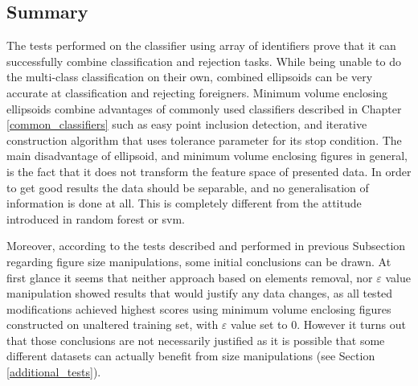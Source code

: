 \subsection{Summary}

The tests performed on the classifier using array of identifiers prove that it can successfully combine classification and rejection tasks. While being unable to do the multi-class classification on their own, combined ellipsoids can be very accurate at classification and rejecting foreigners. Minimum volume enclosing ellipsoids combine advantages of commonly used classifiers described in Chapter \ref{common_classifiers} such as easy point inclusion detection, and iterative construction algorithm that uses tolerance parameter for its stop condition. The main disadvantage of ellipsoid, and minimum volume enclosing figures in general, is the fact that it does not transform the feature space of presented data. In order to get good results the data should be separable, and no generalisation of information is done at all. This is completely different from the attitude introduced in random forest or svm.

Moreover, according to the tests described and performed in previous Subsection regarding figure size manipulations, some initial conclusions can be drawn. At first glance it seems that neither approach based on elements removal, nor $\varepsilon$ value manipulation showed results that would justify any data changes, as all tested modifications achieved highest scores using minimum volume enclosing figures constructed on unaltered training set, with $\varepsilon$ value set to 0. However it turns out that those conclusions are not necessarily justified as it is possible that some different datasets can actually benefit from size manipulations (see Section \ref{additional_tests}).